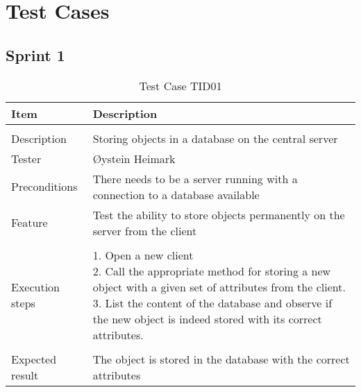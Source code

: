 \appendix



\clearpage


\chapter{Test Cases}
\section{Sprint 1}
\label{sec:sp1testcases}

\begin{table}
\caption{Test Case TID01}
\centering
\begin{tabular}{ l p{13cm} }
\hline 
 Item            & Description                                                              \\ 
\hline \\ [-2.0ex]
 Description     & Storing objects in a database on the central server                        \\ 
 Tester          & Øystein Heimark                  \\ 
 Preconditions   & There needs to be a server running with a connection to a database available \\ 
 Feature         & Test the ability to store objects permanently on the server from the client  \vspace{3pt}                     \\ 
\hline \\ [-1.5ex]
 Execution steps & \pbox{13cm}{1. Open a new client \\ 2. Call the appropriate method for storing a new object with a given set of attributes from the client. \\ 3. List the content of the database and observe if the new object is indeed stored with its correct attributes. } \vspace{3pt} \\
\hline \\ [-1.5ex]
 Expected result & The object is stored in the database with the correct attributes                                          \\
\hline 
\end{tabular}
\label{table:testcasetid01}
\end{table}


